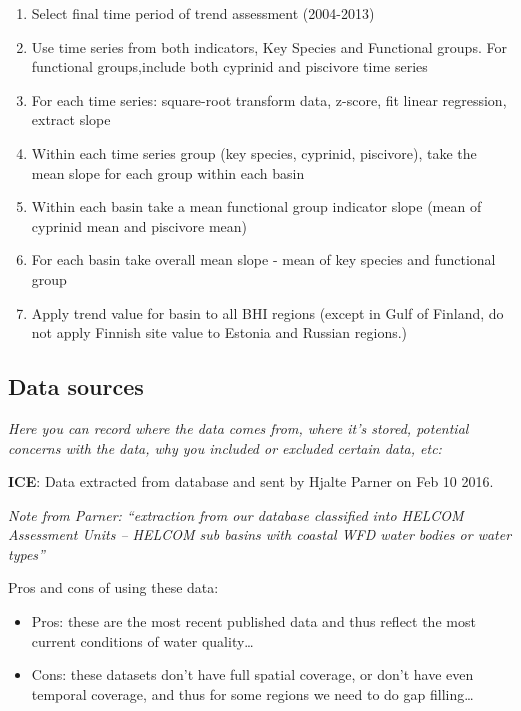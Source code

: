 \documentclass[
]{article}
\providecommand{\tightlist}{%
  \setlength{\itemsep}{0pt}\setlength{\parskip}{0pt}}
\begin{document}
\begin{enumerate}
\def\labelenumi{\arabic{enumi}.}
\item
  Select final time period of trend assessment (2004-2013)
\item
  Use time series from both indicators, Key Species and Functional
  groups. For functional groups,include both cyprinid and piscivore time
  series
\item
  For each time series: square-root transform data, z-score, fit linear
  regression, extract slope
\item
  Within each time series group (key species, cyprinid, piscivore), take
  the mean slope for each group within each basin
\item
  Within each basin take a mean functional group indicator slope (mean
  of cyprinid mean and piscivore mean)
\item
  For each basin take overall mean slope - mean of key species and
  functional group
\item
  Apply trend value for basin to all BHI regions (except in Gulf of
  Finland, do not apply Finnish site value to Estonia and Russian
  regions.)
\end{enumerate}

\hypertarget{data-sources}{%
\subsection{Data sources}\label{data-sources}}

\emph{Here you can record where the data comes from, where it's stored,
potential concerns with the data, why you included or excluded certain
data, etc:}

\textbf{ICE}: Data extracted from database and sent by Hjalte Parner on
Feb 10 2016.

\emph{Note from Parner: ``extraction from our database classified into
HELCOM Assessment Units -- HELCOM sub basins with coastal WFD water
bodies or water types''}

Pros and cons of using these data:

\begin{itemize}
\tightlist
\item
  Pros: these are the most recent published data and thus reflect the
  most current conditions of water quality\ldots{}
\item
  Cons: these datasets don't have full spatial coverage, or don't have
  even temporal coverage, and thus for some regions we need to do gap
  filling\ldots{}
\end{itemize}
\end{document}
